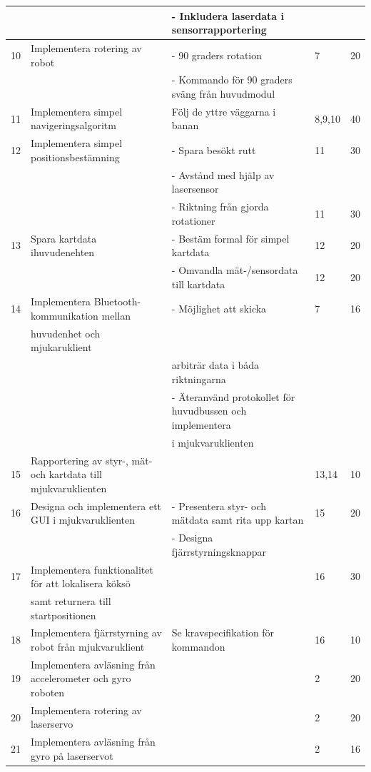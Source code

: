 \documentclass{article}
\begin{document}
\begin{table}[H]
{\begin{tabular}{| l | l | l | l | l|}
   & & - Inkludera laserdata i sensorrapportering & & \\ \hline
 10 & Implementera rotering av robot & - 90 graders rotation & 7 & 20 \\
   & & - Kommando för 90 graders sväng från huvudmodul & & \\ \hline 
 11 & Implementera simpel navigeringsalgoritm & Följ de yttre väggarna i banan & 8,9,10 & 40 \\ \hline
 12 & Implementera simpel positionsbestämning & - Spara besökt rutt & 11 & 30 \\
   & & - Avstånd med hjälp av lasersensor & & \\
   & & - Riktning från gjorda rotationer & 11 & 30 \\ \hline
 13 & Spara kartdata ihuvudenehten & - Bestäm formal för simpel kartdata & 12 & 20 \\
   & & - Omvandla mät-/sensordata till kartdata & 12 & 20 \\ \hline
 14 & Implementera Bluetooth-kommunikation mellan & - Möjlighet att skicka & 7 & 16 \\
   & huvudenhet och mjukaruklient & & & \\
   & & arbiträr data i båda riktningarna & & \\
   & & - Äteranvänd protokollet för huvudbussen och implementera & & \\ 
   & & i mjukvaruklienten & & \\ \hline
 15 & Rapportering av styr-, mät- och kartdata till mjukvaruklienten & & 13,14 & 10 \\ \hline
 16 & Designa och implementera ett GUI i mjukvaruklienten & - Presentera styr- och mätdata samt rita upp kartan & 15 & 20 \\
   & & - Designa fjärrstyrningsknappar & & \\ \hline
 17 & Implementera funktionalitet för att lokalisera köksö & & 16 & 30 \\
  & samt returnera till startpositionen & & & \\ \hline
 18 & Implementera fjärrstyrning av robot från mjukvaruklient & Se kravspecifikation för kommandon & 16 & 10 \\ \hline
 19 & Implementera avläsning från accelerometer och gyro roboten & & 2 & 20 \\ \hline
 20 & Implementera rotering av laserservo & & 2 & 20 \\ \hline
 21 & Implementera avläsning från gyro på laserservot & & 2 & 16 \\ \hline

\end{tabular}}
\end{table}
\end{document}
